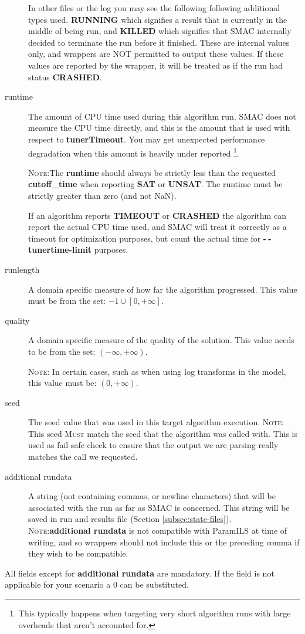 \documentclass[manual.tex]{subfiles}
\begin{document}
\begin{description}
In other files or the log you may see the following following additional types used. \textbf{RUNNING} which signifies a result that is currently in the middle of being run, and \textbf{KILLED} which signifies that SMAC internally decided to terminate the run before it finished. These are internal values only, and wrappers are NOT permitted to output these values. If these values are reported by the wrapper, it will be treated as if the run had status \textbf{CRASHED}.

\item [{runtime}] The amount of CPU time used during this algorithm run.
SMAC does not measure the CPU time directly, and this is the amount
that is used with respect to \textbf{tunerTimeout}. You may get
unexpected performance degradation when this amount is heavily under
reported \footnote{This typically happens when targeting very short algorithm
runs with large overheads that aren't accounted for.}. 

\textsc{Note:}The \textbf{runtime }should always be strictly less
than the requested \textbf{cutoff\_time } when reporting \textbf{SAT
}or \textbf{UNSAT}. The runtime must be strictly greater than zero (and not NaN).

If an algorithm reports \textbf{TIMEOUT} or \textbf{CRASHED} the algorithm can report the actual CPU time used, and SMAC will treat it correctly as a timeout for optimization purposes, but count the actual time for \textbf{-$\!~$-tunertime-limit} purposes.

\item [{runlength}] A domain specific measure of how far the algorithm
progressed. This value must be from the set: ${-1} \cup [0,+\infty]$.

\item [{quality}] A domain specific measure of the quality of the solution. This value needs to be 
from the set: $(-\infty, +\infty)$. 

\textsc{Note}: In certain cases, such as when using log transforms in the model, this value must be: $(0, +\infty)$.

\item [{seed}] The seed value that was used in this target algorithm execution.
\textsc{Note:} This seed \textsc{Must} match the seed that the algorithm was
called with. This is used as fail-safe check to ensure that the output
we are parsing really matches the call we requested.
\item[{additional rundata}] A string (not containing commas, or newline characters) that will be associated with the run as far as SMAC is concerned. This string will be saved in run and results file (Section \ref{subsec:state-files}). \\
\textsc{Note}:\textbf{additional rundata} is not compatible with ParamILS at time of writing, and so wrappers should not include this or the preceding comma if they wish to be compatible.


\end{description}
All fields except for \textbf{additional rundata} are mandatory. If the field is not applicable for your scenario a 0 can be substituted.
\end{document}
